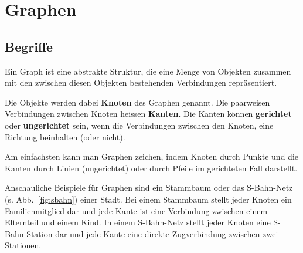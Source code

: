 \section{Graphen}




\subsection{Begriffe}

Ein Graph ist eine abstrakte Struktur, die eine Menge von Objekten zusammen mit den zwischen diesen Objekten bestehenden Verbindungen repräsentiert. 

Die Objekte werden dabei \textbf{Knoten} des Graphen genannt. 
Die paarweisen Verbindungen zwischen Knoten heissen \textbf{Kanten}. 
Die Kanten können \textbf{gerichtet} oder \textbf{ungerichtet} sein, wenn die Verbindungen zwischen den Knoten, eine Richtung beinhalten (oder nicht).

Am einfachsten kann man Graphen zeichen, indem Knoten durch Punkte und die Kanten durch Linien (ungerichtet) oder durch Pfeile im gerichteten Fall darstellt. 

\begin{mbsp}
Anschauliche Beispiele für Graphen sind ein Stammbaum oder das S-Bahn-Netz (s. Abb.~\ref{fig:sbahn}) einer Stadt. 
Bei einem Stammbaum stellt jeder Knoten ein Familienmitglied dar und jede Kante ist eine Verbindung zwischen einem Elternteil und einem Kind. 
In einem S-Bahn-Netz stellt jeder Knoten eine S-Bahn-Station dar und jede Kante eine direkte Zugverbindung zwischen zwei Stationen.
\end{mbsp}
%
%

